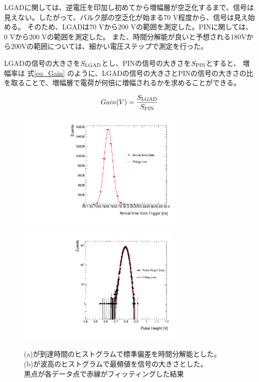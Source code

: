 LGADに関しては、逆電圧を印加し初めてから増幅層が空乏化するまで、信号は見えない。したがって、バルク部の空乏化が始まる70 V程度から、信号は見え始める。
そのため、LGADは70 Vから200 Vの範囲を測定した。PINに関しては、0 Vから200 Vの範囲を測定した。
また、時間分解能が良いと予想される180Vから200Vの範囲については、細かい電圧ステップで測定を行った。

LGADの信号の大きさを$S_{\rm{LGAD}}$とし、PINの信号の大きさを$S_{\rm{PIN}}$とすると、
増幅率は 式\ref{eq_Gain} のように、LGADの信号の大きさとPINの信号の大きさの比を取ることで、増幅層で電荷が何倍に増幅されるかを求めることができる。

\begin{equation}
    {Gain}(V) = \frac{S_{\rm{LGAD}}}{S_{\rm{PIN}}}
    \label{eq_Gain}
\end{equation}


\begin{figure}[h]
    \begin{minipage}[b]{0.5\linewidth}
        \centering
        \includegraphics[width=8cm]{fig/graph/Treso_hist.pdf}
        \label{fg:Treso_hist}
    \end{minipage}
    \begin{minipage}[b]{0.5\linewidth}
        \centering
        \includegraphics[width=8cm]{fig/graph/Ph_hist.pdf}
        \label{fg:Ph_hist}
    \end{minipage}
    \caption[波高と到達時間のヒストグラム]{(a)が到達時間のヒストグラムで標準偏差を時間分解能とした。\\(b)が波高のヒストグラムで最頻値を信号の大きさとした。\\黒点が各データ点で赤線がフィッティングした結果}
\end{figure}


